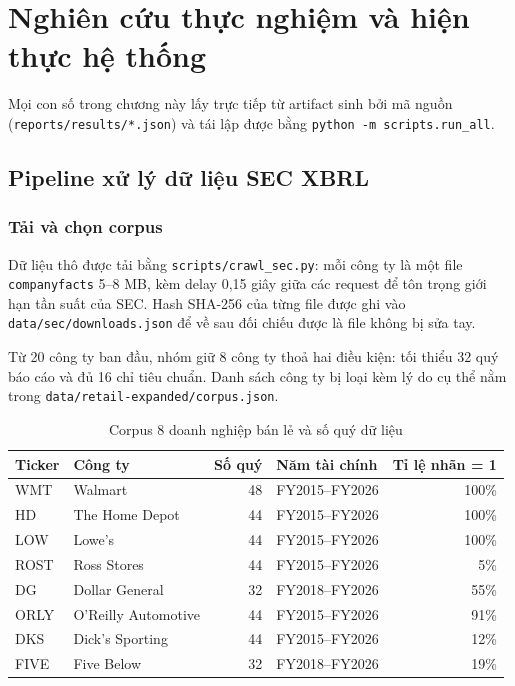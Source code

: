 \chapter{Nghiên cứu thực nghiệm và hiện thực hệ thống}

Mọi con số trong chương này lấy trực tiếp từ artifact sinh bởi mã nguồn
(\texttt{reports/results/*.json}) và tái lập được bằng \texttt{python -m scripts.run\_all}.

\section{Pipeline xử lý dữ liệu SEC XBRL}

\subsection{Tải và chọn corpus}

Dữ liệu thô được tải bằng \texttt{scripts/crawl\_sec.py}: mỗi công ty là một file
\texttt{companyfacts} 5--8 MB, kèm delay 0,15 giây giữa các request để tôn trọng giới hạn tần suất
của SEC. Hash SHA-256 của từng file được ghi vào \texttt{data/sec/downloads.json} để về sau đối
chiếu được là file không bị sửa tay.

Từ 20 công ty ban đầu, nhóm giữ 8 công ty thoả hai điều kiện: tối thiểu 32 quý báo cáo và đủ 16 chỉ
tiêu chuẩn. Danh sách công ty bị loại kèm lý do cụ thể nằm trong
\texttt{data/retail-expanded/corpus.json}.

\begin{table}[H]
\centering
\caption{Corpus 8 doanh nghiệp bán lẻ và số quý dữ liệu}
\label{tab:corpus}
\begin{tabular}{|l|l|r|l|r|}
\hline
\textbf{Ticker} & \textbf{Công ty} & \textbf{Số quý} & \textbf{Năm tài chính} & \textbf{Tỉ lệ nhãn = 1} \\
\hline
WMT  & Walmart            & 48 & FY2015--FY2026 & 100\% \\
HD   & The Home Depot     & 44 & FY2015--FY2026 & 100\% \\
LOW  & Lowe's             & 44 & FY2015--FY2026 & 100\% \\
ROST & Ross Stores        & 44 & FY2015--FY2026 & 5\%   \\
DG   & Dollar General     & 32 & FY2018--FY2026 & 55\%  \\
ORLY & O'Reilly Automotive& 44 & FY2015--FY2026 & 91\%  \\
DKS  & Dick's Sporting    & 44 & FY2015--FY2026 & 12\%  \\
FIVE & Five Below         & 32 & FY2018--FY2026 & 19\%  \\
\hline
\end{tabular}
\end{table}

